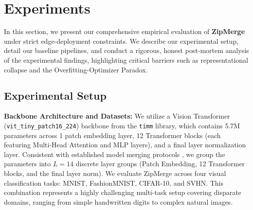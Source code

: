 \section{Experiments}
\label{sec:experiments}

In this section, we present our comprehensive empirical evaluation of \textbf{ZipMerge} under strict edge-deployment constraints. We describe our experimental setup, detail our baseline pipelines, and conduct a rigorous, honest post-mortem analysis of the experimental findings, highlighting critical barriers such as representational collapse and the Overfitting-Optimizer Paradox.

\subsection{Experimental Setup}

\textbf{Backbone Architecture and Datasets:} 
We utilize a Vision Transformer (\texttt{vit\_tiny\_patch16\_224}) backbone from the \texttt{timm} library, which contains 5.7M parameters across 1 patch embedding layer, 12 Transformer blocks (each featuring Multi-Head Attention and MLP layers), and a final layer normalization layer. Consistent with established model merging protocols \cite{yang2024adamerging}, we group the parameters into $L=14$ discrete layer groups (Patch Embedding, 12 Transformer blocks, and the final layer norm). We evaluate ZipMerge across four visual classification tasks: MNIST, FashionMNIST, CIFAR-10, and SVHN. This combination represents a highly challenging multi-task setup covering disparate domains, ranging from simple handwritten digits to complex natural images.

